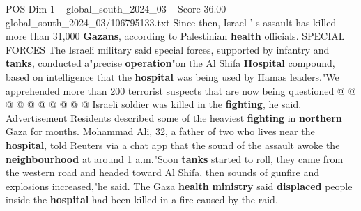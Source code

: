 \begin{textsample}{POS Dim 1 – global\_south\_2024\_03 – Score 36.00 – global\_south\_2024\_03/106795133.txt}
Since then, Israel ' s assault has killed more than 31,000 \textbf{Gazans}, according to Palestinian \textbf{health} officials.
SPECIAL FORCES The Israeli military said special forces, supported by infantry and \textbf{tanks}, conducted a"precise \textbf{operation}"on the Al Shifa \textbf{Hospital} compound, based on intelligence that the \textbf{hospital} was being used by Hamas leaders."We apprehended more than 200 terrorist suspects that are now being questioned @ @ @ @ @ @ @ @ @ @ Israeli soldier was killed in the \textbf{fighting}, he said.
Advertisement Residents described some of the heaviest \textbf{fighting} in \textbf{northern} Gaza for months.
Mohammad Ali, 32, a father of two who lives near the \textbf{hospital}, told Reuters via a chat app that the sound of the assault awoke the \textbf{neighbourhood} at around 1 a.m."Soon \textbf{tanks} started to roll, they came from the western road and headed toward Al Shifa, then sounds of gunfire and explosions increased,"he said.
The Gaza \textbf{health} \textbf{ministry} said \textbf{displaced} people inside the \textbf{hospital} had been killed in a fire caused by the raid.

\end{textsample}
